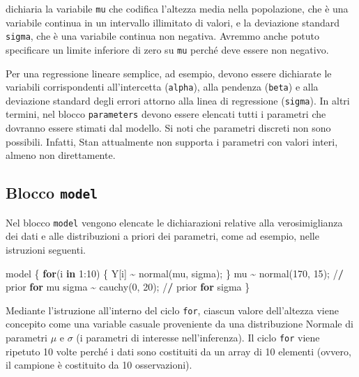 \documentclass[
  11pt,
]{krantz}
\makeatletter
\newenvironment{Shaded}{\begin{snugshade}}{\end{snugshade}}
\newcommand{\ControlFlowTok}[1]{\textcolor[rgb]{0.27,0.27,0.27}{\textbf{#1}}}
\newcommand{\DecValTok}[1]{\textcolor[rgb]{0.06,0.06,0.06}{#1}}
\newcommand{\ErrorTok}[1]{\textcolor[rgb]{0.14,0.14,0.14}{\textbf{#1}}}
\newcommand{\FunctionTok}[1]{\textcolor[rgb]{0,0,0}{#1}}
\newcommand{\NormalTok}[1]{#1}
\newcommand{\SpecialCharTok}[1]{\textcolor[rgb]{0,0,0}{#1}}
\newenvironment{kframe}{%
\medskip{}
\setlength{\fboxsep}{.8em}
 \def\at@end@of@kframe{}%
 \ifinner\ifhmode%
  \def\at@end@of@kframe{\end{minipage}}%
  \begin{minipage}{\columnwidth}%
 \fi\fi%
 \def\FrameCommand##1{\hskip\@totalleftmargin \hskip-\fboxsep
 \colorbox{shadecolor}{##1}\hskip-\fboxsep
     \hskip-\linewidth \hskip-\@totalleftmargin \hskip\columnwidth}%
 \MakeFramed {\advance\hsize-\width
   \@totalleftmargin\z@ \linewidth\hsize
   \@setminipage}}%
 {\par\unskip\endMakeFramed%
 \at@end@of@kframe}
\renewenvironment{Shaded}{\begin{kframe}}{\end{kframe}}
\theoremstyle{definition}
\theoremstyle{definition}
\theoremstyle{definition}
\theoremstyle{definition}
\theoremstyle{remark}
\makeatother
\begin{document}
dichiaria la variabile \texttt{mu} che codifica l'altezza media nella popolazione, che è una variabile continua in un intervallo illimitato di valori, e la deviazione standard \texttt{sigma}, che è una variabile continua non negativa. Avremmo anche potuto specificare un limite inferiore di zero su \texttt{mu} perché deve essere non negativo.

Per una regressione lineare semplice, ad esempio, devono essere dichiarate le variabili corrispondenti all'intercetta (\texttt{alpha}), alla pendenza (\texttt{beta}) e alla deviazione standard degli errori attorno alla linea di regressione (\texttt{sigma}). In altri termini, nel blocco \texttt{parameters} devono essere elencati tutti i parametri che dovranno essere stimati dal modello. Si noti che parametri discreti non sono possibili. Infatti, Stan attualmente non supporta i parametri con valori interi, almeno non direttamente.

\hypertarget{blocco-model}{%
\subsection{\texorpdfstring{Blocco \texttt{model}}{Blocco model}}\label{blocco-model}}

Nel blocco \texttt{model} vengono elencate le dichiarazioni relative alla verosimiglianza dei dati e alle distribuzioni a priori dei parametri, come ad esempio, nelle istruzioni seguenti.

\begin{Shaded}
\begin{Highlighting}[]
\NormalTok{model \{}
  \ControlFlowTok{for}\NormalTok{(i }\ControlFlowTok{in} \DecValTok{1}\SpecialCharTok{:}\DecValTok{10}\NormalTok{) \{}
\NormalTok{    Y[i] }\SpecialCharTok{\textasciitilde{}} \FunctionTok{normal}\NormalTok{(mu, sigma);}
\NormalTok{  \}}
\NormalTok{  mu }\SpecialCharTok{\textasciitilde{}} \FunctionTok{normal}\NormalTok{(}\DecValTok{170}\NormalTok{, }\DecValTok{15}\NormalTok{); }\SpecialCharTok{/}\ErrorTok{/}\NormalTok{ prior }\ControlFlowTok{for}\NormalTok{ mu}
\NormalTok{  sigma }\SpecialCharTok{\textasciitilde{}} \FunctionTok{cauchy}\NormalTok{(}\DecValTok{0}\NormalTok{, }\DecValTok{20}\NormalTok{); }\SpecialCharTok{/}\ErrorTok{/}\NormalTok{ prior }\ControlFlowTok{for}\NormalTok{ sigma}
\NormalTok{\}}
\end{Highlighting}
\end{Shaded}

Mediante l'istruzione all'interno del ciclo \texttt{for}, ciascun valore dell'altezza viene concepito come una variable casuale proveniente da una distribuzione Normale di parametri \(\mu\) e \(\sigma\) (i parametri di interesse nell'inferenza). Il ciclo \texttt{for} viene ripetuto 10 volte perché i dati sono costituiti da un array di 10 elementi (ovvero, il campione è costituito da 10 osservazioni).
\end{document}
